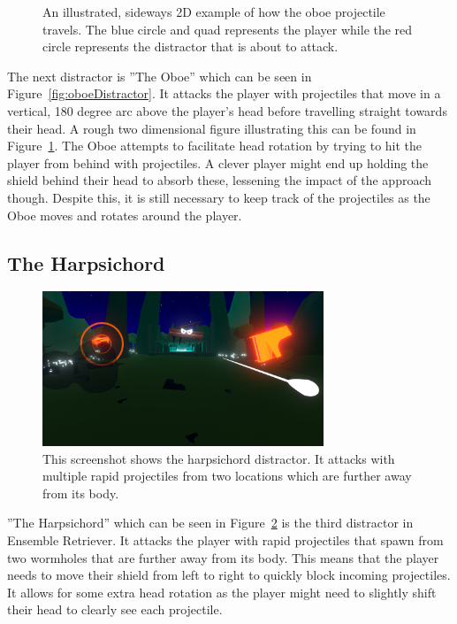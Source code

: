 \begin{figure}[htbp]
  \centering
  
  \caption[Sideways 2D Example of Oboe Projectile Path]{An illustrated, sideways 2D example of how the oboe projectile travels. The blue circle and quad represents the player while the red circle represents the distractor that is about to attack.}
  \label{fig:oboeProjectile}
\end{figure}
The next distractor is ''The Oboe'' which can be seen in Figure~\ref{fig:oboeDistractor}. It attacks the player with projectiles that move in a vertical, 180 degree arc above the player's head before travelling straight towards their head. A rough two dimensional figure illustrating this can be found in Figure~\ref{fig:oboeProjectile}. The Oboe attempts to facilitate head rotation by trying to hit the player from behind with projectiles. A clever player might end up holding the shield behind their head to absorb these, lessening the impact of the approach though. Despite this, it is still necessary to keep track of the projectiles as the Oboe moves and rotates around the player. 

\subsection{The Harpsichord}
\begin{figure}[tbph]
    \centering
    \includegraphics[width=0.75\textwidth]{figures/screenshots/harpsichord.png}
    \caption[The Harpsichord Distractor]{This screenshot shows the harpsichord distractor. It attacks with multiple rapid projectiles from two locations which are further away from its body.}
    \label{fig:harpsichordDistractor}
\end{figure}
''The Harpsichord'' which can be seen in Figure~\ref{fig:harpsichordDistractor} is the third distractor in Ensemble Retriever. It attacks the player with rapid projectiles that spawn from two wormholes that are further away from its body. This means that the player needs to move their shield from left to right to quickly block incoming projectiles. It allows for some extra head rotation as the player might need to slightly shift their head to clearly see each projectile. 

